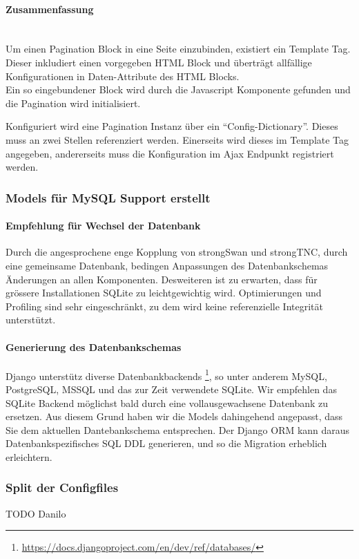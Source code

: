 \paragraph{Zusammenfassung} \hspace{0pt} \\
Um einen Pagination Block in eine Seite einzubinden, existiert ein Template Tag. Dieser inkludiert einen vorgegeben HTML Block und überträgt allfällige
Konfigurationen in Daten-Attribute des HTML Blocks.\\
Ein so eingebundener Block wird durch die Javascript Komponente gefunden und die
Pagination wird initialisiert.

Konfiguriert wird eine Pagination Instanz über ein \enquote{Config-Dictionary}.
Dieses muss an zwei Stellen referenziert werden. Einerseits wird dieses im
Template Tag angegeben, andererseits muss die Konfiguration im Ajax Endpunkt
registriert werden.

\subsubsection{Models für MySQL Support erstellt}
\paragraph{Empfehlung für Wechsel der Datenbank}
Durch die angesprochene enge Kopplung von strongSwan und strongTNC, durch eine gemeinsame Datenbank, bedingen Anpassungen des Datenbankschemas Änderungen an allen Komponenten.
Desweiteren ist zu erwarten, dass für grössere Installationen SQLite zu leichtgewichtig wird.
Optimierungen und Profiling sind sehr eingeschränkt, zu dem wird keine referenzielle Integrität unterstützt.
\paragraph{Generierung des Datenbankschemas}
Django unterstütz diverse Datenbankbackends \footnote{\url{https://docs.djangoproject.com/en/dev/ref/databases/}}, so unter anderem MySQL, PostgreSQL, MSSQL und das zur Zeit verwendete SQLite.
Wir empfehlen das SQLite Backend möglichst bald durch eine vollausgewachsene Datenbank zu ersetzen. Aus diesem Grund haben wir die Models dahingehend angepasst, dass Sie dem aktuellen Dantebankschema entsprechen. 
Der Django ORM kann daraus Datenbankspezifisches SQL DDL generieren, und so die Migration erheblich erleichtern.

\subsubsection{Split der Configfiles}
TODO Danilo

